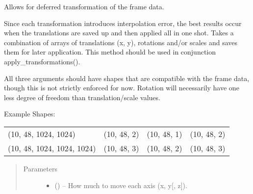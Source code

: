 \documentclass[letterpaper,10pt,english]{sphinxmanual}
\begin{document}
\begin{fulllineitems}
\begin{fulllineitems}
\begin{quote}
\begin{description}
\begin{itemize}
\end{itemize}

\end{description}\end{quote}

\end{fulllineitems}


\begin{fulllineitems}
\label{\detokenize{xanespy:xanespy.xanes_frameset.XanesFrameset.stage_transformations}}
Allows for deferred transformation of the frame data.

Since each transformation introduces interpolation error, the
best results occur when the translations are saved up and then
applied all in one shot. Takes a combination of arrays of
translations (x, y), rotations and/or scales and saves them
for later application. This method should be used in
conjunction apply\_transformations().

All three arguments should have shapes that are compatible
with the frame data, though this is not strictly enforced for
now. Rotation will necessarily have one less degree of freedom
than translation/scale values.

Example Shapes:

\noindent\begin{tabulary}{\linewidth}{|L|L|L|L|}
\hline
{}\relax &\relax &\relax &\relax \\
\hline
(10, 48, 1024, 1024)
&
(10, 48, 2)
&
(10, 48, 1)
&
(10, 48, 2)
\\
\hline
(10, 48, 1024, 1024, 1024)
&
(10, 48, 3)
&
(10, 48, 2)
&
(10, 48, 3)
\\
\hline\end{tabulary}

\begin{quote}\begin{description}
\item[{Parameters}] \leavevmode\begin{itemize}
\item {} 
 () -- How much to move each axis (x, y{[}, z{]}).


\end{itemize}
\end{description}
\end{quote}
\end{fulllineitems}
\end{fulllineitems}
\end{document}
